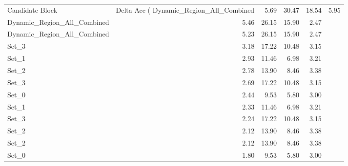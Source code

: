 \begin{tabular}{lrrrr}
\toprule
Candidate Block & Delta Acc (%
\midrule
Dynamic_Region_All_Combined & 5.69 & 30.47 & 18.54 & 5.95 \\
Dynamic_Region_All_Combined & 5.46 & 26.15 & 15.90 & 2.47 \\
Dynamic_Region_All_Combined & 5.23 & 26.15 & 15.90 & 2.47 \\
Set_3 & 3.18 & 17.22 & 10.48 & 3.15 \\
Set_1 & 2.93 & 11.46 & 6.98 & 3.21 \\
Set_2 & 2.78 & 13.90 & 8.46 & 3.38 \\
Set_3 & 2.69 & 17.22 & 10.48 & 3.15 \\
Set_0 & 2.44 & 9.53 & 5.80 & 3.00 \\
Set_1 & 2.33 & 11.46 & 6.98 & 3.21 \\
Set_3 & 2.24 & 17.22 & 10.48 & 3.15 \\
Set_2 & 2.12 & 13.90 & 8.46 & 3.38 \\
Set_2 & 2.12 & 13.90 & 8.46 & 3.38 \\
Set_0 & 1.80 & 9.53 & 5.80 & 3.00 \\
\bottomrule
\end{tabular}
